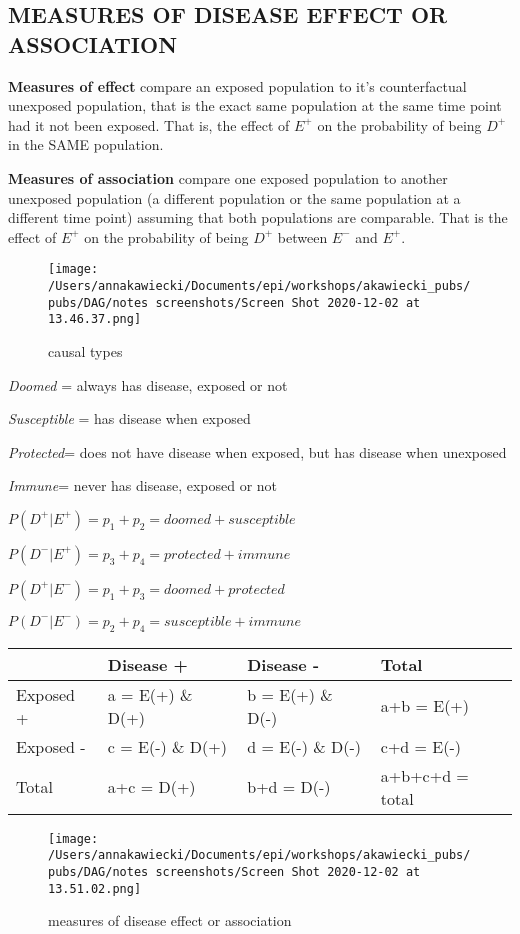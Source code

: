 \documentclass[
]{article}
\begin{document}
\hypertarget{measures-of-disease-effect-or-association}{%
\subsection{MEASURES OF DISEASE EFFECT OR
ASSOCIATION}\label{measures-of-disease-effect-or-association}}

\textbf{Measures of effect} compare an exposed population to it's
counterfactual unexposed population, that is the exact same population
at the same time point had it not been exposed. That is, the effect of
\(E^+\) on the probability of being \(D^+\) in the SAME population.

\textbf{Measures of association} compare one exposed population to
another unexposed population (a different population or the same
population at a different time point) assuming that both populations are
comparable. That is the effect of \(E^+\) on the probability of being
\(D^+\) between \(E^-\) and \(E^+\).

\begin{figure}
\centering
\texttt{[image: /Users/annakawiecki/Documents/epi/workshops/akawiecki\_pubs/pubs/DAG/notes screenshots/Screen Shot 2020-12-02 at 13.46.37.png]}
\caption{causal types}
\end{figure}

\emph{Doomed} = always has disease, exposed or not

\emph{Susceptible} = has disease when exposed

\emph{Protected}= does not have disease when exposed, but has disease
when unexposed

\emph{Immune}= never has disease, exposed or not

\(P(D^+|E^+) = p_1 + p_2 = doomed + susceptible\)

\(P(D^-|E^+) = p_3 + p_4 = protected + immune\)

\(P(D^+|E^-) = p_1 + p_3 = doomed + protected\)

\(P(D^-|E^-) = p_2 + p_4 = susceptible + immune\)

\begin{longtable}[]{@{}llll@{}}
\toprule
& Disease + & Disease - & Total\tabularnewline
\midrule
\endhead
Exposed + & a = E(+) \& D(+) & b = E(+) \& D(-) & a+b =
E(+)\tabularnewline
Exposed - & c = E(-) \& D(+) & d = E(-) \& D(-) & c+d =
E(-)\tabularnewline
Total & a+c = D(+) & b+d = D(-) & a+b+c+d = total\tabularnewline
\bottomrule
\end{longtable}

\begin{figure}
\centering
\texttt{[image: /Users/annakawiecki/Documents/epi/workshops/akawiecki\_pubs/pubs/DAG/notes screenshots/Screen Shot 2020-12-02 at 13.51.02.png]}
\caption{measures of disease effect or association}
\end{figure}
\end{document}
